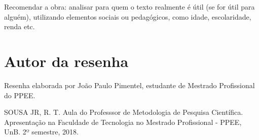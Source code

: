 \documentclass[11pt]{article}
\begin{document}
Recomendar a obra: analisar para quem o texto realmente é útil (se for útil para alguém), utilizando elementos sociais ou pedagógicos, como idade, escolaridade, renda etc.

\section{Autor da resenha}
Resenha elaborada por João Paulo Pimentel, estudante de Mestrado Profissional do PPEE. 




	SOUSA JR, R. T. Aula do Professsor de Metodologia de Pesquisa Científica. Apresentação na Faculdade de Tecnologia no Mestrado Profissional - PPEE, UnB. 2º semestre, 2018.  
\end{document}
